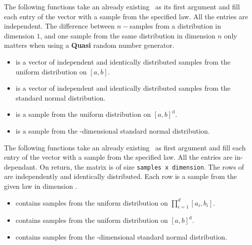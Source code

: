 The following functions take an already existing \PnlVect\ptr\  as
its first argument and fill each entry of the vector with a sample from the
specified law. All the entries are independent. The difference between
$n-$samples from a distribution in dimension $1$, and one sample from the same
distribution in dimension $n$ only matters when using a {\bf Quasi} random
number generator.
\begin{itemize}
\item {}
  \sshortdescribe {} is a vector of independent and identically distributed
  samples from the uniform distribution on $[a, b]$.

\item {}
  \sshortdescribe {} is a vector of independent and identically distributed
  samples from the standard normal distribution.

\item {}
  \sshortdescribe {} is a sample from the uniform distribution on $[a,
  b]^{\text{d}}$.

\item {}
  \sshortdescribe {} is a sample from the -dimensional
  standard normal distribution.

\end{itemize}

The following functions take an already existing \PnlMat\ptr\  as
first argument and fill each entry of the vector with a sample from the
specified law. All the entries are in-dependant. On return, the matrix 
is of size \verb!samples x dimension!. The rows of  are independently
and identically distributed. Each row is a sample from the given law in
dimension .
\begin{itemize}
\item {}
  \sshortdescribe {} contains  samples from the uniform
  distribution on $\prod_{i=1}^d [a_i, b_i]$.

\item {}
  \sshortdescribe {} contains  samples from the uniform
  distribution on $[a, b]^{\text{d}}$.

\item {}
  \sshortdescribe {} contains  samples from the
  -dimensional standard normal distribution.
\end{itemize}

